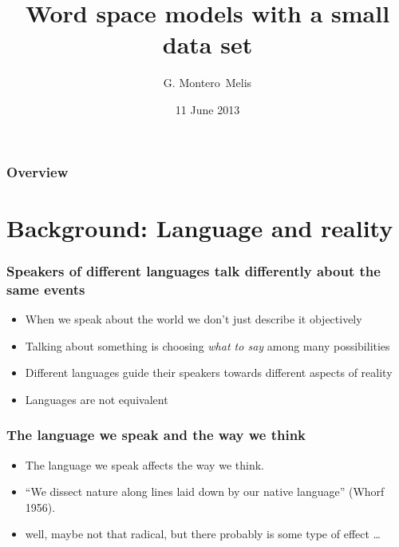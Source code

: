 \documentclass[]{beamer}
\title{
Word space models with a small data set
}
\author{G. Montero~Melis}
\institute{Centre for Research on Bilingualism \\Stockholm University}
\date{11 June 2013}
\begin{document}


\begin{frame}[fragile]
	\maketitle
\end{frame}


\begin{frame}
	\frametitle{Overview}
	\tableofcontents
\end{frame}



\section{Background: Language and reality}


\begin{frame}
	\frametitle{Speakers of different languages talk differently about the same events}
	\begin{itemize}
		\item When we speak about the world we don't just describe it objectively
		\item Talking about something is choosing \emph{what to say} among many possibilities
		\item Different languages guide their speakers towards different aspects of reality
		\item Languages are not equivalent
	\end{itemize}
\end{frame}




\begin{frame}
	\frametitle{The language we speak and the way we think}
	\begin{itemize}
		\item The language we speak affects the way we think.\pause
		\item ``We dissect nature along lines laid down by our native language'' (Whorf 1956).\pause
		\item well, maybe not that radical, but there probably is some type of effect \ldots
	\end{itemize}
\end{frame}
\end{document}
